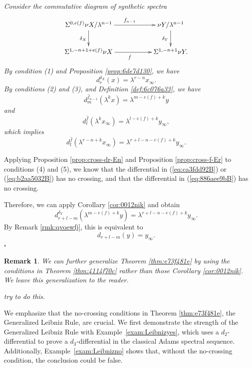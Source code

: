 \documentclass[12pt,a4paper]{article}
\renewenvironment{proof}{{\noindent\it\textbf{Proof}}\quad\it}{\hfill$\square$}
\newtheorem{remark}[equation]{Remark}
\newcommand{\Sus}{\Sigma}
\begin{document}
\begin{sloppy}
\begin{proof}
    Consider the commutative diagram of synthetic spectra
    $$\xymatrix{
        \Sus^{0,e(f)}\nu X/\lambda^{n-1} \ar[rr]^{\hat f_{n-1}}\ar[d]_{\delta_X} && \nu Y/\lambda^{n-1}\ar[d]_{\delta_Y}\\
        \Sus^{1,-n+1+e(f)} \nu X \ar[rr]_{\hat f} && \Sus^{1,-n+1}\nu Y.
    }$$
    By condition (1) and Proposition \ref{prop:6de7d130}, we have
    \begin{equation}\label{eq:ca3fdd92B}
        d^{\delta_X}_r(x)=\lambda^{r-n}x_\infty.
    \end{equation}
    By conditions (2) and (3), and Definition \ref{def:6c076a33}, we have
    \begin{equation}\label{eq:b2aa5032B}
        d^{\hat f_{n-1}}_m(\lambda^k x)=\lambda^{m-e(f)+k} y
    \end{equation}
    and
    \begin{equation*}
        d^{\hat f}_l(\lambda^k x_\infty)=\lambda^{l-e(f)+k} y_\infty,
    \end{equation*}
    which implies
    \begin{equation}\label{eq:886aee9bB}
         d^{\hat f}_l(\lambda^{r-n+k}x_\infty)=\lambda^{r+l-n-e(f)+k}y_\infty.
    \end{equation}

    Applying Proposition \ref{prop:cross-dr-En} and Proposition \ref{prop:cross-f-Er} to conditions (4) and (5), we know that the differential in (\ref{eq:ca3fdd92B}) or (\ref{eq:b2aa5032B}) has no crossing, and that the differential in (\ref{eq:886aee9bB}) has no crossing.

    Therefore, we can apply Corollary \ref{cor:0012nik} and obtain
    $$d^{\delta_Y}_{r+l-m}(\lambda^{m-e(f)+k} y)=\lambda^{r+l-n-e(f)+k} y_\infty.$$
    By Remark \ref{rmk:qvoewfj}, this is equivalent to
    $$d_{r+l-m}(y)= y_\infty.$$
\end{proof}

\begin{remark}
    We can further generalize Theorem \ref{thm:e73f481e} by using the conditions in Theorem \ref{thm:4114f70c} rather than those Corollary \ref{cor:0012nik}. We leave this generalization to the reader.

    try to do this.
\end{remark}

We emphasize that the no-crossing conditions in Theorem \ref{thm:e73f481e}, the Generalized Leibniz Rule, are crucial. We first demonstrate the strength of the Generalized Leibniz Rule with Example~\ref{exam:Leibnizyes}, which uses a $d_2$-differential to prove a $d_3$-differential in the classical Adams spectral sequence. Additionally, Example~\ref{exam:Leibnizno} shows that, without the no-crossing condition, the conclusion could be false.


\end{sloppy}
\end{document}
